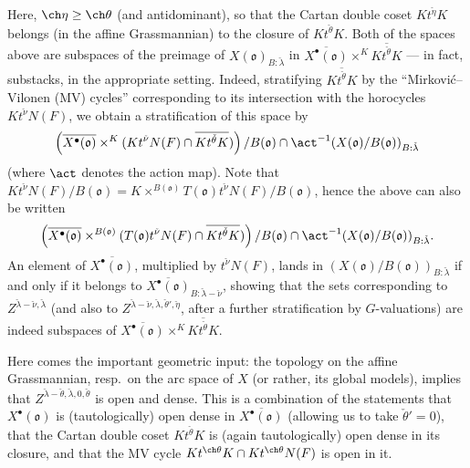 \documentclass[final]{amsart}
\theoremstyle{remark}
\theoremstyle{definition}
\numberwithin{equation}{section}
\begin{document}
Here, $\ch\eta \ge \ch\theta$ (and antidominant), so that the Cartan double coset $K t^{\check\eta} K$ belongs (in the affine Grassmannian) to the closure of $K t^{\check\theta} K$. Both of the spaces above are subspaces of the preimage of $X(\mathfrak o)_{B:\check\lambda}$ in $\overline{X^\bullet(\mathfrak o)} \times^{K} \overline{K t^{\check\theta} K}$ --- in fact, substacks, in the appropriate setting. Indeed, stratifying $\overline{K t^{\check\theta} K}$ by the ``Mirkovi\'c--Vilonen (MV) cycles'' corresponding to its intersection with the horocycles $K t^{\check\nu} N(F)$, we obtain a stratification of this space by 
\[\left(\overline{X^\bullet(\mathfrak o)}  \times^K (K t^{\check\nu} N(F) \cap \overline{K t^{\check\theta} K})\right)/B(\mathfrak o) \cap \act^{-1} (X(\mathfrak o)/B(\mathfrak o))_{B:\check\lambda}\]
(where $\act$ denotes the action map). Note that $K t^{\check\nu} N(F) /B(\mathfrak o) = K\times^{B(\mathfrak o)} T(\mathfrak o) t^{\check\nu} N(F) /B(\mathfrak o)$, hence the above can also be written 
\[\left(\overline{X^\bullet(\mathfrak o)}  \times^{B(\mathfrak o)} (T(\mathfrak o) t^{\check\nu} N(F) \cap \overline{K t^{\check\theta} K})\right)/B(\mathfrak o) \cap \act^{-1} (X(\mathfrak o)/B(\mathfrak o))_{B:\check\lambda}.\]
An element of $\overline{X^\bullet(\mathfrak o)}$, multiplied by $t^{\check\nu} N(F)$, lands in $(X(\mathfrak o)/B(\mathfrak o))_{B:\check\lambda}$ if and only if it belongs to $\overline{X^\bullet(\mathfrak o)}_{B:\check\lambda-\check\nu}$, showing that the sets corresponding to $Z^{\check\lambda - \check\nu, \check\lambda}$ (and also to $Z^{\check\lambda - \check\nu, \check\lambda, \check\theta',\check\eta}$, after a further stratification by $G$-valuations) are indeed subspaces of $\overline{X^\bullet(\mathfrak o)} \times^{K} \overline{K t^{\check\theta} K}$. 


Here comes the important geometric input: the topology on the affine Grassmannian, resp.\ on the arc space of $X$ (or rather, its global models), implies that $Z^{\check\lambda - \check\theta, \check\lambda, 0,\check\theta}$ is open and dense. This is a combination of the statements that $X^\bullet(\mathfrak o)$ is (tautologically) open dense in $\overline{X^\bullet(\mathfrak o)}$ (allowing us to take $\check\theta'=0$), that the Cartan double coset $K t^{\check\theta} K$ is (again tautologically) open dense in its closure, and that the MV cycle $K t^{\ch\theta} K \cap K t^{\ch\theta} N(F)$ is open in it. 
\end{document}
